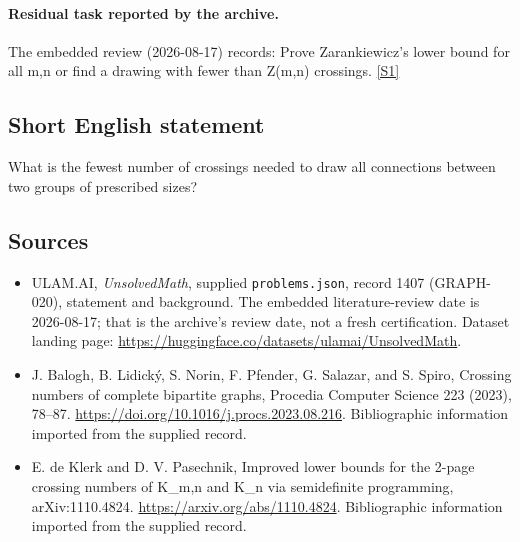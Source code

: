 \documentclass[11pt,a4paper]{article}
\newcommand{\sref}[2]{\hyperlink{source:#1:#2}{[S#2]}}
\begin{document}
\paragraph{Residual task reported by the archive.}

The embedded review (2026-08-17) records: Prove Zarankiewicz's lower bound for all m,n or find a drawing with fewer than Z(m,n) crossings. \sref{1407}{1}

\subsection{Short English statement}

What is the fewest number of crossings needed to draw all connections between two groups of prescribed sizes?

\subsection{Sources}

{\small

\begin{itemize}

\item[\hypertarget{source:1407:1}{S1}] ULAM.AI, \emph{UnsolvedMath}, supplied \texttt{problems.json}, record 1407 (GRAPH-020), statement and background. The embedded literature-review date is 2026-08-17; that is the archive’s review date, not a fresh certification. Dataset landing page: \url{https://huggingface.co/datasets/ulamai/UnsolvedMath}.

\item[\hypertarget{source:1407:2}{S2}] J. Balogh, B. Lidický, S. Norin, F. Pfender, G. Salazar, and S. Spiro, Crossing numbers of complete bipartite graphs, Procedia Computer Science 223 (2023), 78–87. \url{https://doi.org/10.1016/j.procs.2023.08.216}. Bibliographic information imported from the supplied record.

\item[\hypertarget{source:1407:3}{S3}] E. de Klerk and D. V. Pasechnik, Improved lower bounds for the 2-page crossing numbers of K\_{m,n} and K\_n via semidefinite programming, arXiv:1110.4824. \url{https://arxiv.org/abs/1110.4824}. Bibliographic information imported from the supplied record.

\end{itemize}

}

\label{end:1407}
\end{document}

